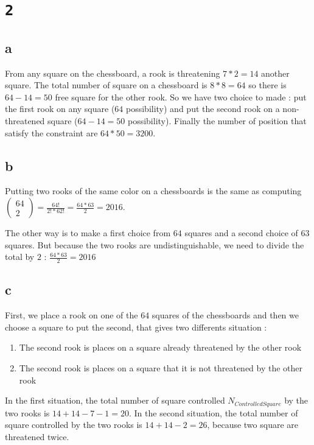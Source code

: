 \documentclass[a4paper,11pt]{report}
\begin{document}
\section*{\texttt{2}}
\subsection*{a}

From any square on the chessboard, a rook is threatening $7*2 = 14$ another
square. The total number of square on a chessboard is $8*8 = 64$ so there is
$64-14 = 50$ free square for the other rook. So we have two choice to made : put
the first rook on any square ($64$ possibility) and put the second rook on a
non-threatened square ($64 - 14 = 50$ possibility). Finally the number of
position that satisfy the constraint are $64 * 50 = 3200$.

\subsection*{b}

Putting two rooks of the same color on a chessboards is the same as computing
$\begin{pmatrix}64 \\ 2\end{pmatrix} = \frac{64!}{2! * 62!} = \frac{64 * 63}{2}
= 2016$.

The other way is to make a first choice from $64$ squares and a second choice of
$63$ squares. But because the two rooks are undistinguishable, we need to divide
the total by $2$ : $\frac{64*63}{2} = 2016$

\subsection*{c}

First, we place a rook on one of the $64$ squares of the chessboards and then we
choose a square to put the second, that gives two differents situation :
\begin{enumerate}
\item The second rook is places on a square already threatened by the other rook
\item The second rook is places on a square that it is not threatened by the other rook
\end{enumerate}

In the first situation, the total number of square controlled
$N_{ControlledSquare}$ by the two rooks is $14 + 14 - 7 - 1 = 20$. In the second
situation, the total number of square controlled by the two rooks is $14 + 14 -
2 = 26$, because two square are threatened twice.
\end{document}
